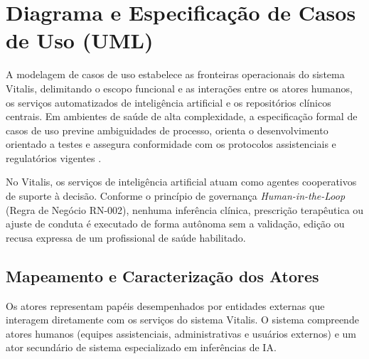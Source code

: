 \section{Diagrama e Especificação de Casos de Uso (UML)}
\label{sec:casos_uso}

A modelagem de casos de uso estabelece as fronteiras operacionais do sistema Vitalis, delimitando o escopo funcional e as interações entre os atores humanos, os serviços automatizados de inteligência artificial e os repositórios clínicos centrais. Em ambientes de saúde de alta complexidade, a especificação formal de casos de uso previne ambiguidades de processo, orienta o desenvolvimento orientado a testes e assegura conformidade com os protocolos assistenciais e regulatórios vigentes \cite{pressman:2016, sommerville:2019}.

No Vitalis, os serviços de inteligência artificial atuam como agentes cooperativos de suporte à decisão. Conforme o princípio de governança \textit{Human-in-the-Loop} (Regra de Negócio RN-002), nenhuma inferência clínica, prescrição terapêutica ou ajuste de conduta é executado de forma autônoma sem a validação, edição ou recusa expressa de um profissional de saúde habilitado.

\subsection{Mapeamento e Caracterização dos Atores}
\label{sec:atores}

Os atores representam papéis desempenhados por entidades externas que interagem diretamente com os serviços do sistema Vitalis. O sistema compreende atores humanos (equipes assistenciais, administrativas e usuários externos) e um ator secundário de sistema especializado em inferências de IA.


